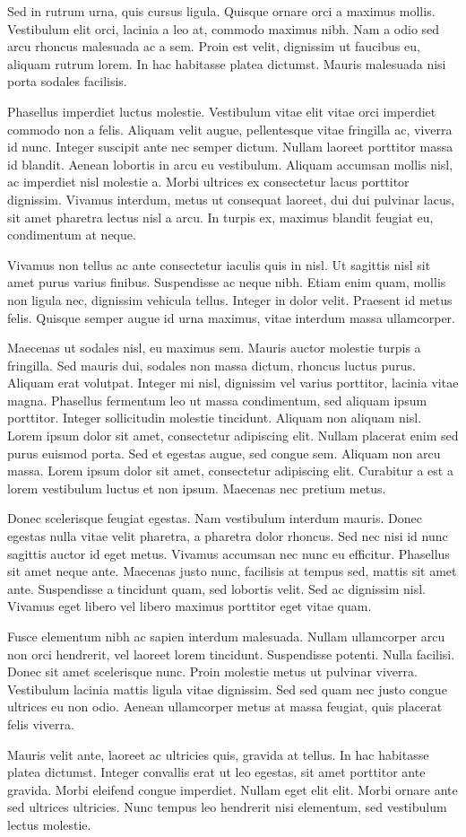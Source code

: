 Sed in rutrum urna, quis cursus ligula. Quisque ornare orci a maximus mollis. Vestibulum elit orci, lacinia a leo at, commodo maximus nibh. Nam a odio sed arcu rhoncus malesuada ac a sem. Proin est velit, dignissim ut faucibus eu, aliquam rutrum lorem. In hac habitasse platea dictumst. Mauris malesuada nisi porta sodales facilisis.

Phasellus imperdiet luctus molestie. Vestibulum vitae elit vitae orci imperdiet commodo non a felis. Aliquam velit augue, pellentesque vitae fringilla ac, viverra id nunc. Integer suscipit ante nec semper dictum. Nullam laoreet porttitor massa id blandit. Aenean lobortis in arcu eu vestibulum. Aliquam accumsan mollis nisl, ac imperdiet nisl molestie a. Morbi ultrices ex consectetur lacus porttitor dignissim. Vivamus interdum, metus ut consequat laoreet, dui dui pulvinar lacus, sit amet pharetra lectus nisl a arcu. In turpis ex, maximus blandit feugiat eu, condimentum at neque.

Vivamus non tellus ac ante consectetur iaculis quis in nisl. Ut sagittis nisl sit amet purus varius finibus. Suspendisse ac neque nibh. Etiam enim quam, mollis non ligula nec, dignissim vehicula tellus. Integer in dolor velit. Praesent id metus felis. Quisque semper augue id urna maximus, vitae interdum massa ullamcorper.

Maecenas ut sodales nisl, eu maximus sem. Mauris auctor molestie turpis a fringilla. Sed mauris dui, sodales non massa dictum, rhoncus luctus purus. Aliquam erat volutpat. Integer mi nisl, dignissim vel varius porttitor, lacinia vitae magna. Phasellus fermentum leo ut massa condimentum, sed aliquam ipsum porttitor. Integer sollicitudin molestie tincidunt. Aliquam non aliquam nisl. Lorem ipsum dolor sit amet, consectetur adipiscing elit. Nullam placerat enim sed purus euismod porta. Sed et egestas augue, sed congue sem. Aliquam non arcu massa. Lorem ipsum dolor sit amet, consectetur adipiscing elit. Curabitur a est a lorem vestibulum luctus et non ipsum. Maecenas nec pretium metus.

Donec scelerisque feugiat egestas. Nam vestibulum interdum mauris. Donec egestas nulla vitae velit pharetra, a pharetra dolor rhoncus. Sed nec nisi id nunc sagittis auctor id eget metus. Vivamus accumsan nec nunc eu efficitur. Phasellus sit amet neque ante. Maecenas justo nunc, facilisis at tempus sed, mattis sit amet ante. Suspendisse a tincidunt quam, sed lobortis velit. Sed ac dignissim nisl. Vivamus eget libero vel libero maximus porttitor eget vitae quam.

Fusce elementum nibh ac sapien interdum malesuada. Nullam ullamcorper arcu non orci hendrerit, vel laoreet lorem tincidunt. Suspendisse potenti. Nulla facilisi. Donec sit amet scelerisque nunc. Proin molestie metus ut pulvinar viverra. Vestibulum lacinia mattis ligula vitae dignissim. Sed sed quam nec justo congue ultrices eu non odio. Aenean ullamcorper metus at massa feugiat, quis placerat felis viverra.

Mauris velit ante, laoreet ac ultricies quis, gravida at tellus. In hac habitasse platea dictumst. Integer convallis erat ut leo egestas, sit amet porttitor ante gravida. Morbi eleifend congue imperdiet. Nullam eget elit elit. Morbi ornare ante sed ultrices ultricies. Nunc tempus leo hendrerit nisi elementum, sed vestibulum lectus molestie. 

